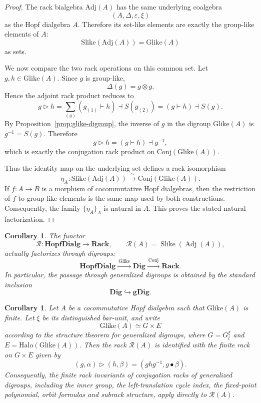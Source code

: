 \documentclass[11pt]{article}
\theoremstyle{plain}
\newtheorem{corollary}[theorem]{Corollary}
\theoremstyle{definition}
\theoremstyle{remark}
\DeclareMathOperator{\Slike}{Slike}
\DeclareMathOperator{\Adj}{Adj}
\begin{document}
	\begin{proof}
		The rack bialgebra \(\mathrm{Adj}(A)\) has the same underlying coalgebra
		\[
		(A,\Delta,\varepsilon,\xi)
		\]
		as the Hopf dialgebra \(A\). Therefore its set-like elements are exactly the
		group-like elements of \(A\):
		\[
		\mathrm{Slike}(\mathrm{Adj}(A))
		=
		\mathrm{Glike}(A)
		\]
		as sets.
		
		We now compare the two rack operations on this common set. Let
		\(g,h\in\mathrm{Glike}(A)\). Since \(g\) is group-like,
		\[
		\Delta(g)=g\otimes g.
		\]
		Hence the adjoint rack product reduces to
		\[
		g\triangleright h
		=
		\sum_{(g)}(g_{(1)}\vdash h)\dashv S(g_{(2)})
		=
		(g\vdash h)\dashv S(g).
		\]
		By Proposition~\ref{prop:glike-digroup}, the inverse of \(g\) in the
		digroup \(\mathrm{Glike}(A)\) is \(g^{-1}=S(g)\). Therefore
		\[
		g\triangleright h
		=
		(g\vdash h)\dashv g^{-1},
		\]
		which is exactly the conjugation rack product on
		\(\mathrm{Conj}(\mathrm{Glike}(A))\).
		
		Thus the identity map on the underlying set defines a rack isomorphism
		\[
		\eta_A:
		\mathrm{Slike}(\mathrm{Adj}(A))
		\xrightarrow{\ \sim\ }
		\mathrm{Conj}(\mathrm{Glike}(A)).
		\]
		If \(f:A\to B\) is a morphism of cocommutative Hopf dialgebras, then the
		restriction of \(f\) to group-like elements is the same map used by both
		constructions. Consequently, the family \(\{\eta_A\}_A\) is natural in
		\(A\). This proves the stated natural factorization.
	\end{proof}
	
	\begin{corollary}\label{cor:factorization-through-digroups}
		The functor
		\[
		\mathcal{R}:
		\mathbf{HopfDialg}\longrightarrow\mathbf{Rack},
		\qquad
		\mathcal R(A)=\Slike(\Adj(A)),
		\]
		actually factorizes through digroups:
		\[
		\mathbf{HopfDialg}
		\xrightarrow{\ \mathrm{Glike}\ }
		\mathbf{Dig}
		\xrightarrow{\ \mathrm{Conj}\ }
		\mathbf{Rack}.
		\]
		In particular, the passage through generalized digroups is obtained by the
		standard inclusion
		\[
		\mathbf{Dig}\hookrightarrow\mathbf{gDig}.
		\]
	\end{corollary}
	
	\begin{corollary}\label{cor:combinatorics-for-group-likes}
		Let \(A\) be a cocommutative Hopf dialgebra such that
		\(\mathrm{Glike}(A)\) is finite. Let \(\xi\) be its distinguished bar-unit,
		and write
		\[
		\mathrm{Glike}(A)\simeq G\times E
		\]
		according to the structure theorem for generalized digroups, where
		\(G=G_l^\xi\) and \(E=\mathrm{Halo}(\mathrm{Glike}(A))\). Then the rack
		\(\mathcal{R}(A)\) is identified with the finite rack on \(G\times E\)
		given by
		\[
		(g,\alpha)\triangleright(h,\beta)
		=
		(ghg^{-1},g\bullet\beta).
		\]
		Consequently, the finite rack invariants of conjugation racks of generalized
		digroups, including the inner group, the left-translation cycle index, the
		fixed-point polynomial, orbit formulas and subrack structure, apply directly
		to \(\mathcal{R}(A)\).
	\end{corollary}
	
\end{document}
